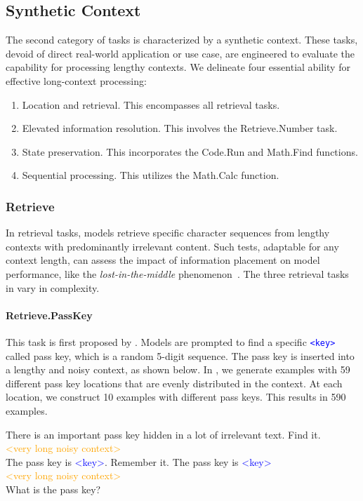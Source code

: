 \subsection{Synthetic Context}

The second category of tasks is characterized by a synthetic context. These tasks, devoid of direct real-world application or use case, are engineered to evaluate the capability for processing lengthy contexts. We delineate four essential ability for effective long-context processing:

\begin{enumerate}[itemsep=0pt, parsep=0pt]
    \item Location and retrieval. This encompasses all retrieval tasks.
    \item Elevated information resolution. This involves the Retrieve.Number task.
    \item State preservation. This incorporates the Code.Run and Math.Find functions.
    \item Sequential processing. This utilizes the Math.Calc function.
\end{enumerate}

\subsubsection{Retrieve}

In retrieval tasks, models retrieve specific character sequences from lengthy contexts with predominantly irrelevant content. Such tests, adaptable for any context length, can assess the impact of information placement on model performance, like the \emph{lost-in-the-middle} phenomenon~\citep{lost-in-the-middle}. The three retrieval tasks in \OURSSPACE vary in complexity.

\paragraph{Retrieve.PassKey} 

This task is first proposed by \citet{Mohtashami2023LandmarkAR}. Models are prompted to find a specific \textcolor{blue}{\texttt{<key>}} called pass key, which is a random 5-digit sequence. The pass key is inserted into a lengthy and noisy context, as shown below. In \OURS, we generate examples with 59 different pass key locations that are evenly distributed in the context. At each location, we construct 10 examples with different pass keys. This results in 590 examples.
\begin{tcolorbox}
\small
There is an important pass key hidden in a lot of irrelevant text. Find it.\\
\textcolor{orange}{<very long noisy context>}\\
The pass key is \textcolor{blue}{<key>}. Remember it. The pass key is \textcolor{blue}{<key>}\\
\textcolor{orange}{<very long noisy context>}\\
What is the pass key?
\end{tcolorbox}

